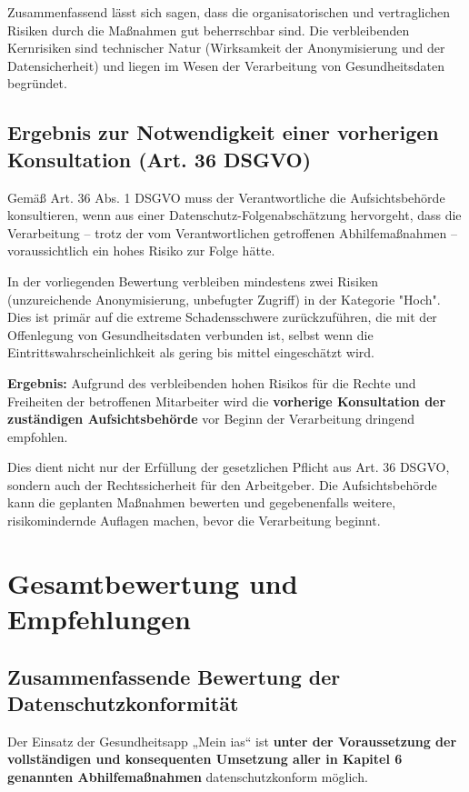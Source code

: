 \documentclass[12pt, a4paper]{article}
\begin{document}
Zusammenfassend lässt sich sagen, dass die organisatorischen und vertraglichen Risiken durch die Maßnahmen gut beherrschbar sind. Die verbleibenden Kernrisiken sind technischer Natur (Wirksamkeit der Anonymisierung und der Datensicherheit) und liegen im Wesen der Verarbeitung von Gesundheitsdaten begründet.

\subsection{Ergebnis zur Notwendigkeit einer vorherigen Konsultation (Art. 36 DSGVO)}
Gemäß Art. 36 Abs. 1 DSGVO muss der Verantwortliche die Aufsichtsbehörde konsultieren, wenn aus einer Datenschutz-Folgenabschätzung hervorgeht, dass die Verarbeitung – trotz der vom Verantwortlichen getroffenen Abhilfemaßnahmen – voraussichtlich ein hohes Risiko zur Folge hätte.

In der vorliegenden Bewertung verbleiben mindestens zwei Risiken (unzureichende Anonymisierung, unbefugter Zugriff) in der Kategorie "Hoch". Dies ist primär auf die extreme Schadensschwere zurückzuführen, die mit der Offenlegung von Gesundheitsdaten verbunden ist, selbst wenn die Eintrittswahrscheinlichkeit als gering bis mittel eingeschätzt wird.

\textbf{Ergebnis:}
Aufgrund des verbleibenden hohen Risikos für die Rechte und Freiheiten der betroffenen Mitarbeiter wird die \textbf{vorherige Konsultation der zuständigen Aufsichtsbehörde} vor Beginn der Verarbeitung dringend empfohlen.

Dies dient nicht nur der Erfüllung der gesetzlichen Pflicht aus Art. 36 DSGVO, sondern auch der Rechtssicherheit für den Arbeitgeber. Die Aufsichtsbehörde kann die geplanten Maßnahmen bewerten und gegebenenfalls weitere, risikomindernde Auflagen machen, bevor die Verarbeitung beginnt.

\section{Gesamtbewertung und Empfehlungen}

\subsection{Zusammenfassende Bewertung der Datenschutzkonformität}
Der Einsatz der Gesundheitsapp „Mein ias“ ist \textbf{unter der Voraussetzung der vollständigen und konsequenten Umsetzung aller in Kapitel 6 genannten Abhilfemaßnahmen} datenschutzkonform möglich.
\end{document}
